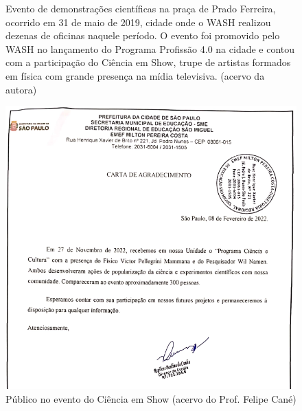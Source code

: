 \documentclass[
12pt,		%
openright,	%
twoside,  %
a4paper,			%
chapter=TITLE,		%
english,			%
french,				%
spanish,			%
brazil				%
]{USPSC-classe/USPSC}
\begin{document}
\begin{figure}[max size={\textwidth}{\textheight}]
\begin{minipage}[b]{0.4\linewidth}
                \caption{Evento de demonstra\c{c}\~oes cient\'{i}ficas na pra\c{c}a de Prado Ferreira, ocorrido em 31 de maio de 2019, cidade onde o WASH realizou dezenas de oficinas naquele per\'{i}odo. O evento foi promovido pelo WASH no lan\c{c}amento do Programa Profiss\~ao 4.0 na cidade e contou com a participa\c{c}\~ao do Ci\^encia em Show, trupe de artistas formados em f\'{i}sica com grande presen\c{c}a na m\'{i}dia televisiva. (acervo da autora)}
                \label{7b56c85cc265fcbf261a3bc788ae1e4619b70725}
\end{minipage}
\hspace{0.5cm}
\end{figure}














\captionsetup{format=plain}
\begin{figure}[max size={\textwidth}{\textheight}]

\centering


\begin{minipage}[b]{0.4\linewidth}
        \centering
                \includegraphics[width=1.0\linewidth]{../../imagens/evento-sao-miguel.png}
                \caption{P\'ublico no evento do Ci\^encia em Show (acervo do Prof. Felipe Can\'e)}
                \label{1005d976e3ba4fdcea3be1ed7501eff18485a145}
\end{minipage}%
\hspace{0.5cm}
\end{figure}
\end{document}

